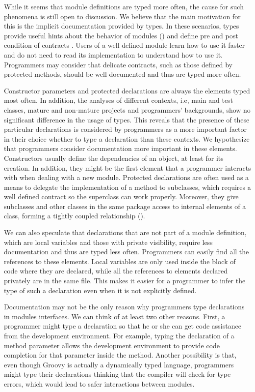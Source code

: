 \documentclass[msc]{ppgccufmg}
\begin{document}
While it seems that module definitions are typed more often, the cause for such phenomena is still open to discussion.
We believe that the main motivation for this is the implicit documentation provided by types.
In these scenarios, types provide useful hints about the behavior of modules (\cite{Curtis1987}) and define pre and post condition of contracts
\cite{Meyer88, Meijer04, Wadler04, Plosch97, Flanagan2006, Furr09}.
Users of a well defined module learn how to use it faster and do not need to read its implementation to understand how to use it.
Programmers may consider that delicate contracts, such as those defined by protected methods, should be well documented and thus are typed more often.

Constructor parameters and protected declarations are always the elements typed most often.
In addition, the analyses of different contexts, i.e, main and test classes, mature and non-mature projects and programmers' backgrounds, show no significant difference in the usage of types.
This reveals that the presence of these particular declarations is considered by programmers as a more important factor in their choice whether to type a declaration than these contexts.
We hypothesize that programmers consider documentation more important in these elements.
Constructors usually define the dependencies of an object, at least for its creation.
In addition, they might be the first element that a programmer interacts with when dealing with a new module.
Protected declarations are often used as a means to delegate the implementation of a method to subclasses, which requires a well defined contract so the superclass can work properly.
Moreover, they give subclasses and other classes in the same package access to internal elements of a class, forming a tightly coupled relationship (\cite{Chidamber94}).


We can also speculate that declarations that are not part of a module definition, which are local variables and those with private visibility, require less documentation and thus are typed less often.
Programmers can easily find all the references to these elements.
Local variables are only used inside the block of code where they are declared, while all the references to elements declared privately are in the same file.
This makes it easier for a programmer to infer the type of such a declaration even when it is not explicitly defined.

Documentation may not be the only reason why programmers type declarations in modules interfaces.
We can think of at least two other reasons.
First, a programmer might type a declaration so that he or she can get code assistance from the development environment.
For example, typing the declaration of a method parameter allows the development environment to provide code completion for that parameter inside the method.
Another possibility is that, even though Groovy is actually a dynamically typed language, programmers might type their declarations thinking that the compiler will check for type errors, which would lead to safer interactions between modules.
\end{document}
